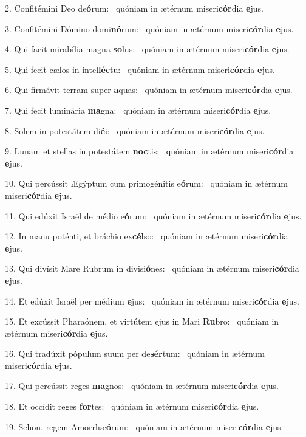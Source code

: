 2. Confitémini Deo de\textbf{ó}rum: \ast\  quóniam in ætérnum miseri\textbf{cór}dia \textbf{e}jus.\

3. Confitémini Dómino domi\textbf{nó}rum: \ast\  quóniam in ætérnum miseri\textbf{cór}dia \textbf{e}jus.\

4. Qui facit mirabília magna \textbf{so}lus: \ast\  quóniam in ætérnum miseri\textbf{cór}dia \textbf{e}jus.\

5. Qui fecit cælos in intel\textbf{léc}tu: \ast\  quóniam in ætérnum miseri\textbf{cór}dia \textbf{e}jus.\

6. Qui firmávit terram super \textbf{a}quas: \ast\  quóniam in ætérnum miseri\textbf{cór}dia \textbf{e}jus.\

7. Qui fecit luminária \textbf{ma}gna: \ast\  quóniam in ætérnum miseri\textbf{cór}dia \textbf{e}jus.\

8. Solem in potestátem di\textbf{é}i: \ast\  quóniam in ætérnum miseri\textbf{cór}dia \textbf{e}jus.\

9. Lunam et stellas in potestátem \textbf{noc}tis: \ast\  quóniam in ætérnum miseri\textbf{cór}dia \textbf{e}jus.\

10. Qui percússit Ægýptum cum primogénitis e\textbf{ó}rum: \ast\  quóniam in ætérnum miseri\textbf{cór}dia \textbf{e}jus.\

11. Qui edúxit Israël de médio e\textbf{ó}rum: \ast\  quóniam in ætérnum miseri\textbf{cór}dia \textbf{e}jus.\

12. In manu poténti, et bráchio ex\textbf{cél}so: \ast\  quóniam in ætérnum miseri\textbf{cór}dia \textbf{e}jus.\

13. Qui divísit Mare Rubrum in divisi\textbf{ó}nes: \ast\  quóniam in ætérnum miseri\textbf{cór}dia \textbf{e}jus.\

14. Et edúxit Israël per médium \textbf{e}jus: \ast\  quóniam in ætérnum miseri\textbf{cór}dia \textbf{e}jus.\

15. Et excússit Pharaónem, et virtútem ejus in Mari \textbf{Ru}bro: \ast\  quóniam in ætérnum miseri\textbf{cór}dia \textbf{e}jus.\

16. Qui tradúxit pópulum suum per de\textbf{sér}tum: \ast\  quóniam in ætérnum miseri\textbf{cór}dia \textbf{e}jus.\

17. Qui percússit reges \textbf{ma}gnos: \ast\  quóniam in ætérnum miseri\textbf{cór}dia \textbf{e}jus.\

18. Et occídit reges \textbf{for}tes: \ast\  quóniam in ætérnum miseri\textbf{cór}dia \textbf{e}jus.\

19. Sehon, regem Amorrhæ\textbf{ó}rum: \ast\  quóniam in ætérnum miseri\textbf{cór}dia \textbf{e}jus.\

